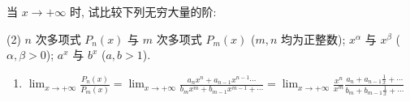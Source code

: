 \begin{exercise}[1.3.17]
    当 $x \to +\infty$ 时, 试比较下列无穷大量的阶:
    \begin{tasks}[label=(\arabic*)](2)
        \task $n$ 次多项式 $P_n(x)$ 与 $m$ 次多项式 $P_m(x)$ ($m,n$ 均为正整数);
        \task $x^\alpha$ 与 $x^\beta$ ($\alpha, \beta > 0$);
        \task $a^x$ 与 $b^x$ ($a, b > 1$).
    \end{tasks}
\end{exercise}
\begin{solution}
    \begin{enumerate}
        \item 
        $\lim_{x \to +\infty} \frac{P_n(x)}{P_m(x)} = \lim_{x \to +\infty} \frac{a_n x^n +a_{n-1} x^{n-1} \cdots}{b_m x^m +b_{m-1} x^{m-1} +\cdots} 
        = \lim_{x \to +\infty} \frac{x^n}{x^m}\frac{a_n  +a_{n-1} \frac{1}{x} +\cdots}{b_m + b_{m-1}\frac{1}{x} +\cdots}$ 
        

\end{enumerate}
\end{solution}
